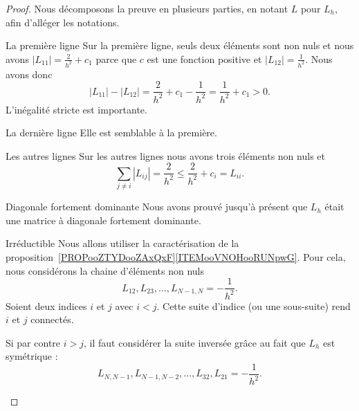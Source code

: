 \begin{proof}
    Nous décomposons la preuve en plusieurs parties, en notant \( L\) pour \( L_h\), afin d'alléger les notations.
    \begin{subproof}
        \item[La première ligne]
            Sur la première ligne, seuls deux éléments sont non nuls et nous avons \( | L_{11} |=\frac{ 2 }{ h^2 }+c_1\) parce que \( c\) est une fonction positive et \( | L_{12}|=\frac{1}{ h^2 }\). Nous avons donc
        \begin{equation}
            | L_{11} |-| L_{12} |=\frac{ 2 }{ h^2 }+c_1-\frac{1}{ h^2 }=\frac{1}{ h^2 }+c_1>0.
        \end{equation}
        L'inégalité stricte est importante.

        \item[La dernière ligne]
        Elle est semblable à la première.

        \item[Les autres lignes]
        Sur les autres lignes nous avons trois éléments non nuls et
        \begin{equation}
            \sum_{j\neq i}| L_{ij} |=\frac{ 2 }{ h^2 }\leq \frac{ 2 }{ h^2 }+c_i=L_{ii}.
        \end{equation}

        \item[Diagonale fortement dominante]
        Nous avons prouvé jusqu'à présent que \( L_h\) était une matrice à diagonale fortement dominante.

        \item[Irréductible]
        Nous allons utiliser la caractérisation de la proposition~\ref{PROPooZTYDooZAxQxF}\ref{ITEMooVNOHooRUNpwG}. Pour cela, nous considérons la chaine d'éléments non nuls
        \begin{equation}
            L_{12}, L_{23},\ldots, L_{N-1,N}=-\frac{1}{ h^2 }.
        \end{equation}
        Soient deux indices \( i\) et \( j\) avec \( i<j\). Cette suite d'indice (ou une sous-suite) rend \( i\) et \( j\) connectés.

        Si par contre \( i>j\), il faut considérer la suite inversée grâce au fait que \( L_h\) est symétrique :
        \begin{equation}
            L_{N,N-1},L_{N-1,N-2},\ldots, L_{32}, L_{21}=-\frac{ 1 }{ h^2 }.
        \end{equation}
    \end{subproof}
\end{proof}

